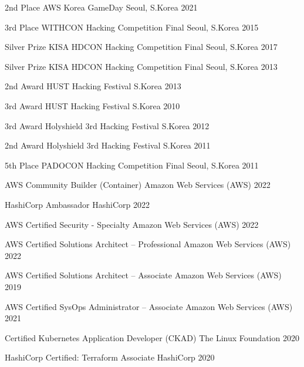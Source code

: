 \documentclass[11pt, a4paper]{../awesome-cv}
\begin{document}
\begin{cvhonors}

\cvhonor
    {2nd Place} {AWS Korea GameDay} {Seoul, S.Korea} {2021} 

\cvhonor
    {3rd Place} {WITHCON Hacking Competition Final} {Seoul, S.Korea} {2015} 

\cvhonor
    {Silver Prize} {KISA HDCON Hacking Competition Final} {Seoul, S.Korea} {2017} 

\cvhonor
    {Silver Prize} {KISA HDCON Hacking Competition Final} {Seoul, S.Korea} {2013} 

\cvhonor
    {2nd Award} {HUST Hacking Festival} {S.Korea} {2013} 

\cvhonor
    {3rd Award} {HUST Hacking Festival} {S.Korea} {2010} 

\cvhonor
    {3rd Award} {Holyshield 3rd Hacking Festival} {S.Korea} {2012} 

\cvhonor
    {2nd Award} {Holyshield 3rd Hacking Festival} {S.Korea} {2011} 

\cvhonor
    {5th Place} {PADOCON Hacking Competition Final} {Seoul, S.Korea} {2011} 

\end{cvhonors}



\begin{cvhonors}

\cvhonor
    {AWS Community Builder (Container)} {Amazon Web Services (AWS)} {} {2022} 

\cvhonor
    {HashiCorp Ambassador} {HashiCorp} {} {2022} 

\end{cvhonors}


\begin{cvhonors}

\cvhonor
    {AWS Certified Security - Specialty} {Amazon Web Services (AWS)} {} {2022} 

\cvhonor
    {AWS Certified Solutions Architect – Professional} {Amazon Web Services (AWS)} {} {2022} 

\cvhonor
    {AWS Certified Solutions Architect – Associate} {Amazon Web Services (AWS)} {} {2019} 

\cvhonor
    {AWS Certified SysOps Administrator – Associate} {Amazon Web Services (AWS)} {} {2021} 

\cvhonor
    {Certified Kubernetes Application Developer (CKAD)} {The Linux Foundation} {} {2020} 

\cvhonor
    {HashiCorp Certified: Terraform Associate} {HashiCorp} {} {2020} 

\end{cvhonors}
\end{document}
